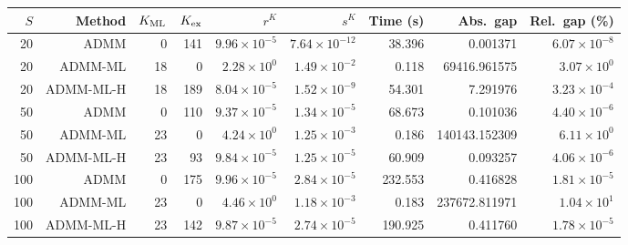 \begin{tabular}{rrrrrrrrr}
\toprule
$S$ & Method & $K_{\rm ML}$ & $K_{\rm ex}$ & $r^K$ & $s^K$ & Time (s) & Abs.\ gap & Rel.\ gap (\%) \\
\midrule
20 & ADMM & 0 & 141 & $9.96\times 10^{-5}$ & $7.64\times 10^{-12}$ & 38.396 & 0.001371 & $6.07\times 10^{-8}$ \\
20 & ADMM-ML & 18 & 0 & $2.28\times 10^{0}$ & $1.49\times 10^{-2}$ & 0.118 & 69416.961575 & $3.07\times 10^{0}$ \\
20 & ADMM-ML-H & 18 & 189 & $8.04\times 10^{-5}$ & $1.52\times 10^{-9}$ & 54.301 & 7.291976 & $3.23\times 10^{-4}$ \\
\midrule
50 & ADMM & 0 & 110 & $9.37\times 10^{-5}$ & $1.34\times 10^{-5}$ & 68.673 & 0.101036 & $4.40\times 10^{-6}$ \\
50 & ADMM-ML & 23 & 0 & $4.24\times 10^{0}$ & $1.25\times 10^{-3}$ & 0.186 & 140143.152309 & $6.11\times 10^{0}$ \\
50 & ADMM-ML-H & 23 & 93 & $9.84\times 10^{-5}$ & $1.25\times 10^{-5}$ & 60.909 & 0.093257 & $4.06\times 10^{-6}$ \\
\midrule
100 & ADMM & 0 & 175 & $9.96\times 10^{-5}$ & $2.84\times 10^{-5}$ & 232.553 & 0.416828 & $1.81\times 10^{-5}$ \\
100 & ADMM-ML & 23 & 0 & $4.46\times 10^{0}$ & $1.18\times 10^{-3}$ & 0.183 & 237672.811971 & $1.04\times 10^{1}$ \\
100 & ADMM-ML-H & 23 & 142 & $9.87\times 10^{-5}$ & $2.74\times 10^{-5}$ & 190.925 & 0.411760 & $1.78\times 10^{-5}$ \\
\bottomrule
\end{tabular}
